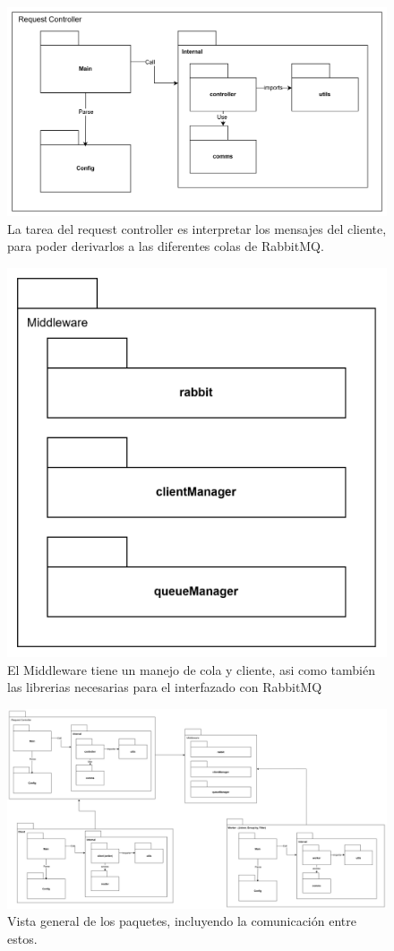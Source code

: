 \documentclass[titlepage,a4paper]{article}
\begin{document}
\begin{figure}[H]
    \centering
    \includegraphics[width=1\linewidth]{request_controller.png}
    \caption{La tarea del request controller es interpretar los mensajes del cliente, para poder derivarlos a las diferentes colas de RabbitMQ.}
\end{figure}

\begin{figure}[H]
    \centering
    \includegraphics[width=0.45\linewidth]{middleware.png}
    \caption{El Middleware tiene un manejo de cola y cliente, asi como también las librerias necesarias para el interfazado con RabbitMQ}
\end{figure}
\begin{figure}
    \centering
    \includegraphics[width=1.4\textwidth, angle=90]{general.png}
    \caption{Vista general de los paquetes, incluyendo la comunicación entre estos.}
\end{figure}
\end{document}
